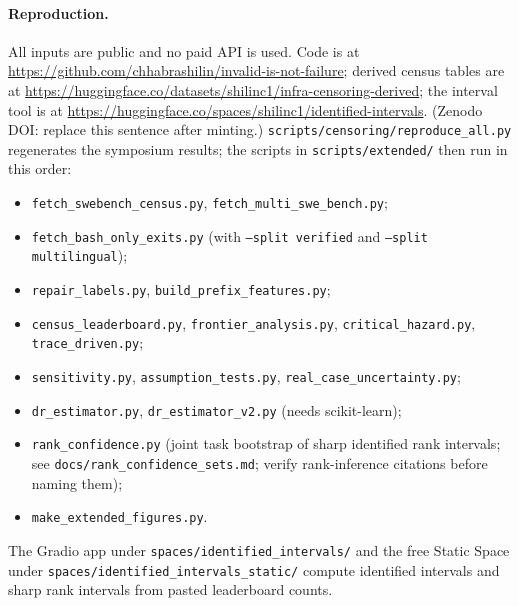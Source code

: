 \documentclass[11pt]{article}
\theoremstyle{definition}
\theoremstyle{remark}
\begin{document}
\paragraph{Reproduction.} All inputs are public and no paid API is used.
Code is at \url{https://github.com/chhabrashilin/invalid-is-not-failure};
derived census tables are at
\url{https://huggingface.co/datasets/shilinc1/infra-censoring-derived};
the interval tool is at
\url{https://huggingface.co/spaces/shilinc1/identified-intervals}.
(Zenodo DOI: replace this sentence after minting.)
\texttt{scripts/censoring/reproduce\_all.py} regenerates the symposium results;
the scripts in \texttt{scripts/extended/} then run in this order:
\begin{itemize}
\item \texttt{fetch\_swebench\_census.py}, \texttt{fetch\_multi\_swe\_bench.py};
\item \texttt{fetch\_bash\_only\_exits.py} (with \texttt{--split verified} and
\texttt{--split multilingual});
\item \texttt{repair\_labels.py}, \texttt{build\_prefix\_features.py};
\item \texttt{census\_leaderboard.py}, \texttt{frontier\_analysis.py},
\texttt{critical\_hazard.py}, \texttt{trace\_driven.py};
\item \texttt{sensitivity.py}, \texttt{assumption\_tests.py},
\texttt{real\_case\_uncertainty.py};
\item \texttt{dr\_estimator.py}, \texttt{dr\_estimator\_v2.py} (needs
scikit-learn);
\item \texttt{rank\_confidence.py} (joint task bootstrap of sharp identified
rank intervals; see \texttt{docs/rank\_confidence\_sets.md}; verify
rank-inference citations before naming them);
\item \texttt{make\_extended\_figures.py}.
\end{itemize}
The Gradio app under \texttt{spaces/identified\_intervals/} and the free Static
Space under \texttt{spaces/identified\_intervals\_static/} compute identified
intervals and sharp rank intervals from pasted leaderboard counts.
\end{document}
